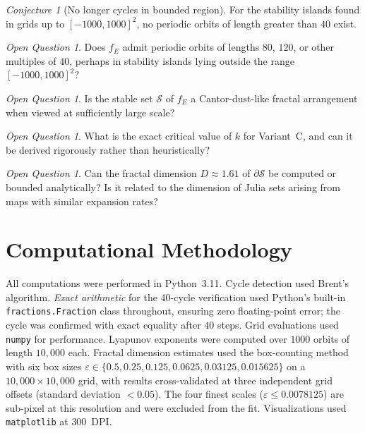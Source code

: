 \documentclass[12pt]{article}
\theoremstyle{plain}
\theoremstyle{definition}
\theoremstyle{remark}
\newtheorem{conjecture}[theorem]{Conjecture}
\newtheorem{openquestion}[theorem]{Open Question}
\theoremstyle{definition}
\begin{document}
\begin{conjecture}[No longer cycles in bounded region]
For the stability islands found in grids up to $[-1000,1000]^2$, no
periodic orbits of length greater than $40$ exist.
\end{conjecture}

\begin{openquestion}
Does $f_E$ admit periodic orbits of lengths $80$, $120$, or
other multiples of $40$, perhaps in stability islands lying
outside the range $[-1000,1000]^2$?
\end{openquestion}

\begin{openquestion}
Is the stable set $\mathcal{S}$ of $f_E$ a Cantor-dust-like
fractal arrangement when viewed at sufficiently large scale?
\end{openquestion}

\begin{openquestion}
What is the exact critical value of $k$ for Variant~C,
and can it be derived rigorously rather than heuristically?
\end{openquestion}

\begin{openquestion}
Can the fractal dimension $D \approx 1.61$ of $\partial\mathcal{S}$
be computed or bounded analytically?
Is it related to the dimension of Julia sets arising from maps
with similar expansion rates?
\end{openquestion}

\section{Computational Methodology}
\label{sec:computational}

All computations were performed in Python~3.11.
Cycle detection used Brent's algorithm.
\emph{Exact arithmetic} for the 40-cycle verification used
Python's built-in \texttt{fractions.Fraction} class throughout,
ensuring zero floating-point error; the cycle was confirmed with
exact equality after $40$ steps.
Grid evaluations used \texttt{numpy} for performance.
Lyapunov exponents were computed over $1000$ orbits of length
$10{,}000$ each.
Fractal dimension estimates used the box-counting method 
with six box sizes $\varepsilon \in \{0.5, 0.25, 0.125, 
0.0625, 0.03125, 0.015625\}$ on a $10{,}000 \times 10{,}000$ 
grid, with results cross-validated at three independent grid 
offsets (standard deviation $< 0.05$). The four finest scales 
($\varepsilon \leq 0.0078125$) are sub-pixel at this resolution 
and were excluded from the fit.
Visualizations used \texttt{matplotlib} at $300$~DPI.
\end{document}
